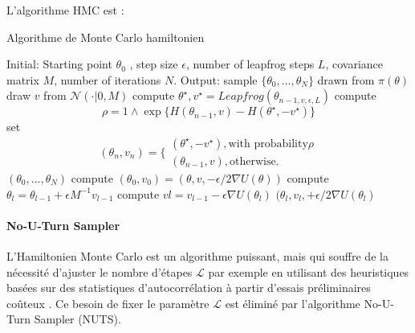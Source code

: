 \noindent L’algorithme HMC est :

\begin{algorithm}
	\caption{Algorithme de Monte Carlo hamiltonien \cite{wu2018faster}}
	\label{hmc_algo}
	\begin{algorithmic}[1]
		\State Initial: Starting point $\theta_{0}$ , step size $\epsilon $, number of leapfrog steps $L$, covariance matrix $M$, number of iterations $N$.
		\State Output: sample $\{ \theta_{0},...,\theta_{N}\}$ drawn from $\pi(\theta)$
			\State draw $v$ from $\mathcal{N}(\cdot|0,M)$ 
			\State compute $\theta^{\star},v^{\star} = Leapfrog(\theta_{n-1,v,\epsilon,L})$ compute
			\begin{equation}
				\rho = 1 \wedge \exp \{ H(\theta_{n-1},v) - H(\theta^{\star},-v^{\star})\}
			\end{equation}
			\State set
			\begin{equation}
				(\theta_{n},v_{n}) = \Biggl\{
				\begin{array}{ll}
					(\theta^{\star},-v^{\star}), \text{with probability} \rho \\
					(\theta_{n-1},v), \text{otherwise.}
				\end{array}
			\end{equation}
		\EndFor
		\State \Return $(\theta_{0},...,\theta_{N})$
			\State compute $(\theta_{0},v_{0}) = (\theta,v,- \epsilon / 2 \nabla U(\theta))$
				\State compute $\theta_{l} = \theta_{l-1} + \epsilon M^{-1}v_{l-1}$
				\State compute $v{l} = v_{l-1} -\epsilon \nabla U(\theta_{l})$
			\EndFor
			\State \Return $(\theta_{l},v_{l},+ \epsilon / 2 \nabla U(\theta_{l})$
		\EndFunction
	\end{algorithmic}
\end{algorithm}

\paragraph{No-U-Turn Sampler}
L’Hamiltonien Monte Carlo est un algorithme puissant, mais qui souffre de la nécessité d'ajuster le nombre d'étapes \(\displaystyle \mathcal{L}  \) par exemple en utilisant des heuristiques basées sur des statistiques d'autocorrélation à partir d'essais préliminaires coûteux \cite{neal2011mcmc}. Ce besoin de fixer le paramètre \(\displaystyle \mathcal{L}  \) est éliminé par l’algorithme No-U-Turn Sampler (NUTS). \\

